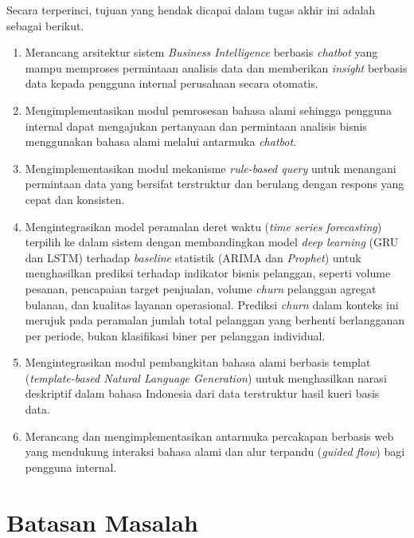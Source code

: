 Secara terperinci, tujuan yang hendak dicapai dalam tugas akhir ini adalah sebagai berikut.
\begin{enumerate}
  \item Merancang arsitektur sistem \textit{Business Intelligence} berbasis \textit{chatbot} yang mampu memproses permintaan analisis data dan memberikan \textit{insight} berbasis data kepada pengguna internal perusahaan secara otomatis.
  \item Mengimplementasikan modul pemrosesan bahasa alami sehingga pengguna internal dapat mengajukan pertanyaan dan permintaan analisis bisnis menggunakan bahasa alami melalui antarmuka \textit{chatbot}. 
  \item Mengimplementasikan modul mekanisme \textit{rule-based query} untuk menangani permintaan data yang bersifat terstruktur dan berulang dengan respons yang cepat dan konsisten.
  \item Mengintegrasikan model peramalan deret waktu (\textit{time series forecasting}) terpilih ke dalam sistem dengan membandingkan model \textit{deep learning} (GRU dan LSTM) terhadap \textit{baseline} statistik (ARIMA dan \textit{Prophet}) untuk menghasilkan prediksi terhadap indikator bisnis pelanggan, seperti volume pesanan, pencapaian target penjualan, volume \textit{churn} pelanggan agregat bulanan, dan kualitas layanan operasional. Prediksi \textit{churn} dalam konteks ini merujuk pada peramalan jumlah total pelanggan yang berhenti berlangganan per periode, bukan klasifikasi biner per pelanggan individual.
  \item Mengintegrasikan modul pembangkitan bahasa alami berbasis templat (\textit{template-based Natural Language Generation}) untuk menghasilkan narasi deskriptif dalam bahasa Indonesia dari data terstruktur hasil kueri basis data.
  \item Merancang dan mengimplementasikan antarmuka percakapan berbasis web yang mendukung interaksi bahasa alami dan alur terpandu (\textit{guided flow}) bagi pengguna internal.
\end{enumerate}

\section{Batasan Masalah}


